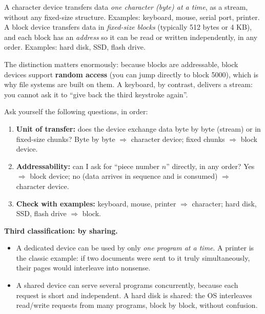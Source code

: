 \documentclass[11pt]{article}
\newcommand{\cle}[1]{{\popxbold\color{popdark}#1}}
\begin{document}
\begin{definition}
A \cle{character device} transfers data \emph{one character (byte) at a time}, as a stream, without any fixed-size structure. Examples: keyboard, mouse, serial port, printer.
A \cle{block device} transfers data in \emph{fixed-size blocks} (typically 512 bytes or 4 KB), and each block has an \emph{address} so it can be read or written independently, in any order. Examples: hard disk, SSD, flash drive.
\end{definition}

The distinction matters enormously: because blocks are addressable, block devices support \textbf{random access} (you can jump directly to block 5000), which is why file systems are built on them. A keyboard, by contrast, delivers a stream: you cannot ask it to ``give back the third keystroke again''.

\begin{methode}
Ask yourself the following questions, in order:
\begin{enumerate}
\item \textbf{Unit of transfer:} does the device exchange data byte by byte (stream) or in fixed-size chunks? Byte by byte $\Rightarrow$ character device; fixed chunks $\Rightarrow$ block device.
\item \textbf{Addressability:} can I ask for ``piece number $n$'' directly, in any order? Yes $\Rightarrow$ block device; no (data arrives in sequence and is consumed) $\Rightarrow$ character device.
\item \textbf{Check with examples:} keyboard, mouse, printer $\Rightarrow$ character; hard disk, SSD, flash drive $\Rightarrow$ block.
\end{enumerate}
\end{methode}

\textbf{Third classification: by sharing.}
\begin{itemize}
\item A \cle{dedicated device} can be used by only \emph{one program at a time}. A printer is the classic example: if two documents were sent to it truly simultaneously, their pages would interleave into nonsense.
\item A \cle{shared device} can serve several programs concurrently, because each request is short and independent. A hard disk is shared: the OS interleaves read/write requests from many programs, block by block, without confusion.
\end{itemize}
\end{document}
